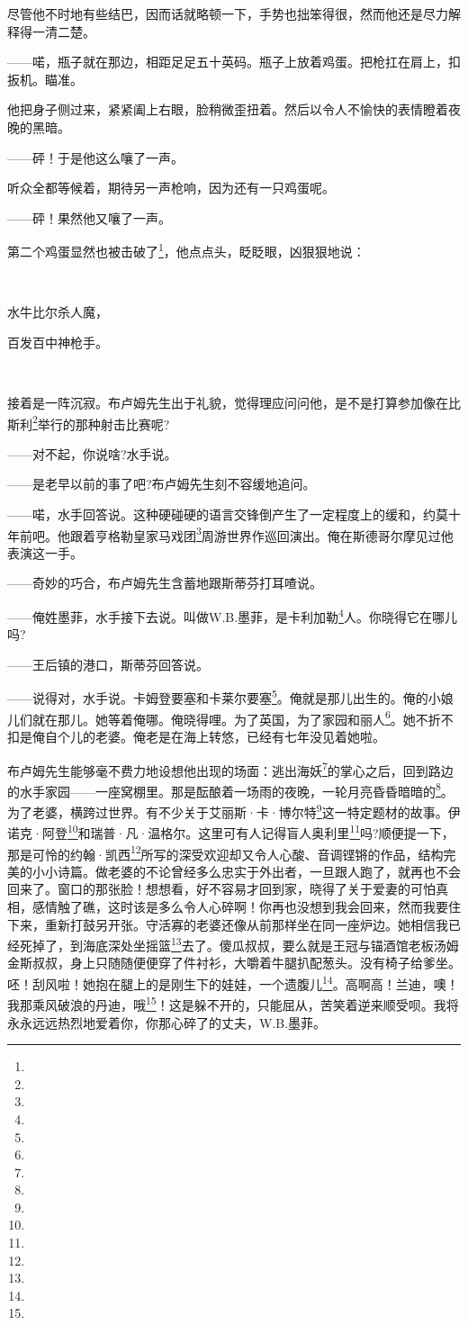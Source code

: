 \par 尽管他不时地有些结巴，因而话就略顿一下，手势也拙笨得很，然而他还是尽力解释得一清二楚。
\par ——喏，瓶子就在那边，相距足足五十英码。瓶子上放着鸡蛋。把枪扛在肩上，扣扳机。瞄准。
\par 他把身子侧过来，紧紧阖上右眼，脸稍微歪扭着。然后以令人不愉快的表情瞪着夜晚的黑暗。
\par ——砰！于是他这么嚷了一声。
\par 听众全都等候着，期待另一声枪响，因为还有一只鸡蛋呢。
\par ——砰！果然他又嚷了一声。
\par 第二个鸡蛋显然也被击破了\footnote{}，他点点头，眨眨眼，凶狠狠地说：
\par  
\par 水牛比尔杀人魔，
\par 百发百中神枪手。
\par  
\par 接着是一阵沉寂。布卢姆先生出于礼貌，觉得理应问问他，是不是打算参加像在比斯利\footnote{}举行的那种射击比赛呢?
\par ——对不起，你说啥?水手说。
\par ——是老早以前的事了吧?布卢姆先生刻不容缓地追问。
\par ——喏，水手回答说。这种硬碰硬的语言交锋倒产生了一定程度上的缓和，约莫十年前吧。他跟着亨格勒皇家马戏团\footnote{}周游世界作巡回演出。俺在斯德哥尔摩见过他表演这一手。
\par ——奇妙的巧合，布卢姆先生含蓄地跟斯蒂芬打耳喳说。
\par ——俺姓墨菲，水手接下去说。叫做W.B.墨菲，是卡利加勒\footnote{}人。你晓得它在哪儿吗?
\par ——王后镇的港口，斯蒂芬回答说。
\par ——说得对，水手说。卡姆登要塞和卡莱尔要塞\footnote{}。俺就是那儿出生的。俺的小娘儿们就在那儿。她等着俺哪。俺晓得哩。为了英国，为了家园和丽人\footnote{}。她不折不扣是俺自个儿的老婆。俺老是在海上转悠，已经有七年没见着她啦。
\par 布卢姆先生能够毫不费力地设想他出现的场面：逃出海妖\footnote{}的掌心之后，回到路边的水手家园——一座窝棚里。那是酝酿着一场雨的夜晚，一轮月亮昏昏暗暗的\footnote{}。为了老婆，横跨过世界。有不少关于艾丽斯·卡·博尔特\footnote{}这一特定题材的故事。伊诺克·阿登\footnote{}和瑞普·凡·温格尔。这里可有人记得盲人奥利里\footnote{}吗?顺便提一下，那是可怜的约翰·凯西\footnote{}所写的深受欢迎却又令人心酸、音调铿锵的作品，结构完美的小小诗篇。做老婆的不论曾经多么忠实于外出者，一旦跟人跑了，就再也不会回来了。窗口的那张脸！想想看，好不容易才回到家，晓得了关于爱妻的可怕真相，感情触了礁，这时该是多么令人心碎啊！你再也没想到我会回来，然而我要住下来，重新打鼓另开张。守活寡的老婆还像从前那样坐在同一座炉边。她相信我已经死掉了，到海底深处坐摇篮\footnote{}去了。傻瓜叔叔，要么就是王冠与锚酒馆老板汤姆金斯叔叔，身上只随随便便穿了件衬衫，大嚼着牛腿扒配葱头。没有椅子给爹坐。呸！刮风啦！她抱在腿上的是刚生下的娃娃，一个遗腹儿\footnote{}。高啊高！兰迪，噢！我那乘风破浪的丹迪，哦\footnote{}！这是躲不开的，只能屈从，苦笑着逆来顺受呗。我将永永远远热烈地爱着你，你那心碎了的丈夫，W.B.墨菲。
